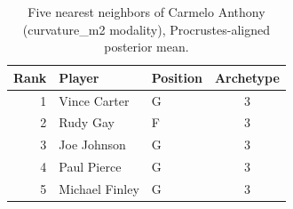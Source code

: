 \begin{table}[htbp]
  \centering\small
  \begin{tabular}{rllc}
    \toprule
    Rank & Player & Position & Archetype \\
    \midrule
    1 & Vince Carter & G & 3 \\
    2 & Rudy Gay & F & 3 \\
    3 & Joe Johnson & G & 3 \\
    4 & Paul Pierce & G & 3 \\
    5 & Michael Finley & G & 3 \\
    \bottomrule
  \end{tabular}
  \caption{Five nearest neighbors of Carmelo Anthony (curvature_m2 modality), Procrustes-aligned posterior mean.}
  \label{tab:Carmelo_Anthony_neighbors_curvature_m2}
\end{table}


